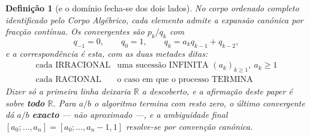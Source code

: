 \documentclass[11pt,a4paper]{article}
\newtheorem{definicao}[teorema]{Definição}
\begin{document}
\begin{definicao}[e o domínio fecha-se dos dois lados]\label{def:real}
No corpo ordenado completo identificado pelo \emph{Corpo Algébrico}, cada
elemento admite a expansão canónica por fracção contínua. Os convergentes são
$p_k/q_k$ com
\[
q_{-1}=0,\qquad q_0=1,\qquad q_k=a_kq_{k-1}+q_{k-2},
\]
e a correspondência é esta, com as duas metades ditas:
\[
\boxed{
\begin{array}{ll}
\text{cada IRRACIONAL} & \text{uma sucessão INFINITA }(a_k)_{k\geq1},\ a_k\geq1\\[2pt]
\text{cada RACIONAL}   & \text{o caso em que o processo TERMINA}
\end{array}}
\]
Dizer só a primeira linha deixaria $\mathbb{R}$ a descoberto, e a afirmação
deste paper é sobre \textbf{todo} $\mathbb{R}$. Para $a/b$ o algoritmo termina com
resto zero, o último convergente dá $a/b$ \textbf{exacto} --- não aproximado
---, e a ambiguidade final $[a_0;\ldots,a_n]=[a_0;\ldots,a_n{-}1,1]$ resolve-se
por convenção canónica.
\end{definicao}
\end{document}
